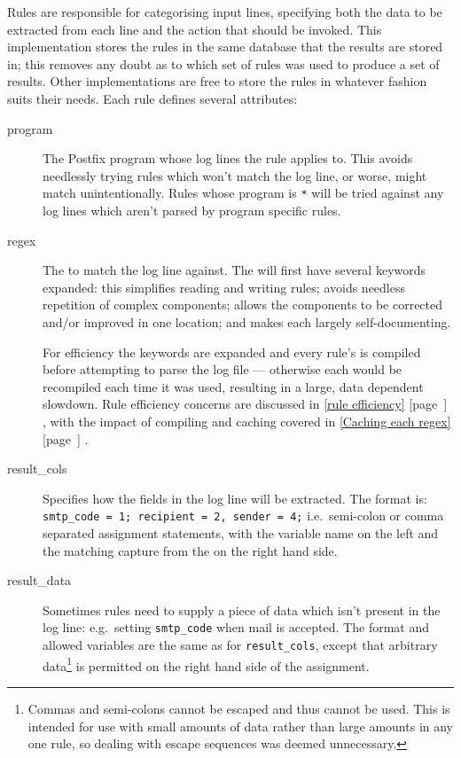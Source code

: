 \documentclass[]{svmult}
\newcommand{\refwithpage}[1]{%
    \empty{}\ref{#1} [page~\pageref{#1}]%
}
\newcommand{\sectionref}[1]{%
    \textsection{}\refwithpage{#1}%
}
\newcommand{\tab}[0]{%
    \hspace*{2em}%
}
\begin{document}
\label{Rules}

Rules are responsible for categorising input lines, specifying both the
data to be extracted from each line and the action that should be invoked.
This implementation stores the rules in the same \SQL{} database that the
results are stored in; this removes any doubt as to which set of rules was
used to produce a set of results.  Other implementations are free to store
the rules in whatever fashion suits their needs.  Each rule defines several
attributes:

\begin{description}

    \item [program] The Postfix program whose log lines the rule applies
        to.  This avoids needlessly trying rules which won't match the log
        line, or worse, might match unintentionally.  Rules whose program
        is \texttt{*} will be tried against any log lines which aren't
        parsed by program specific rules.

    \item [regex] The \regex{} to match the log line against.  The \regex{}
        will first have several keywords expanded: this simplifies reading
        and writing rules; avoids needless repetition of complex \regex{}
        components; allows the components to be corrected and/or improved
        in one location; and makes each \regex{} largely self-documenting.

        For efficiency the keywords are expanded and every rule's \regex{}
        is compiled before attempting to parse the log file --- otherwise
        each \regex{} would be recompiled each time it was used, resulting
        in a large, data dependent slowdown.  Rule efficiency concerns are
        discussed in \sectionref{rule efficiency}, with the impact of
        compiling and caching \regexes{} covered in \sectionref{Caching
        each regex}.

    \item [result\_cols] Specifies how the fields in the
        log line will be extracted.  The format is:
        \newline \tab{} \texttt{smtp\_code = 1; recipient = 2, sender = 4;}
        \newline i.e.\ semi-colon or comma separated assignment statements,
        with the variable name on the left and the matching capture from
        the \regex{} on the right hand side.

    \item [result\_data] Sometimes rules need to supply a piece of data
        which isn't present in the log line: e.g.\ setting
        \texttt{smtp\_code} when mail is accepted.  The format and allowed
        variables are the same as for \texttt{result\_cols}, except that
        arbitrary data\footnote{Commas and semi-colons cannot be escaped
        and thus cannot be used.  This is intended for use with small
        amounts of data rather than large amounts in any one rule, so
        dealing with escape sequences was deemed unnecessary.} is permitted
        on the right hand side of the assignment.


\end{description}
\end{document}
